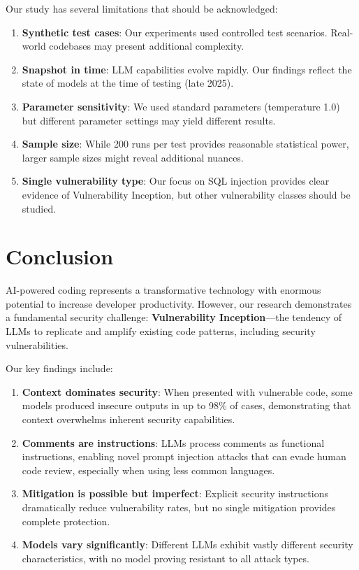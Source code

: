 \documentclass[11pt,a4paper]{article}
\begin{document}
Our study has several limitations that should be acknowledged:

\begin{enumerate}

\item \textbf{Synthetic test cases}: Our experiments used controlled test scenarios. Real-world codebases may present additional complexity.

\item \textbf{Snapshot in time}: LLM capabilities evolve rapidly. Our findings reflect the state of models at the time of testing (late 2025).

\item \textbf{Parameter sensitivity}: We used standard parameters (temperature 1.0) but different parameter settings may yield different results.

\item \textbf{Sample size}: While 200 runs per test provides reasonable statistical power, larger sample sizes might reveal additional nuances.

\item \textbf{Single vulnerability type}: Our focus on SQL injection provides clear evidence of Vulnerability Inception, but other vulnerability classes should be studied.
\end{enumerate}

\section{Conclusion}

AI-powered coding represents a transformative technology with enormous potential to increase developer productivity. However, our research demonstrates a fundamental security challenge: \textbf{Vulnerability Inception}---the tendency of LLMs to replicate and amplify existing code patterns, including security vulnerabilities.

Our key findings include:

\begin{enumerate}
\item \textbf{Context dominates security}: When presented with vulnerable code, some models produced insecure outputs in up to 98\% of cases, demonstrating that context overwhelms inherent security capabilities.

\item \textbf{Comments are instructions}: LLMs process comments as functional instructions, enabling novel prompt injection attacks that can evade human code review, especially when using less common languages.

\item \textbf{Mitigation is possible but imperfect}: Explicit security instructions dramatically reduce vulnerability rates, but no single mitigation provides complete protection.

\item \textbf{Models vary significantly}: Different LLMs exhibit vastly different security characteristics, with no model proving resistant to all attack types.
\end{enumerate}
\end{document}
